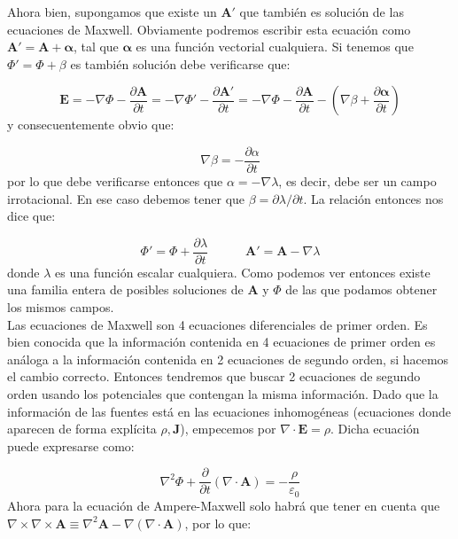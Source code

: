\documentclass[12pt,a4paper]{article}
\newcommand{\parentesis}[1]{\left( #1  \right)}
\newcommand{\parciales}[2]{\frac{\partial #1}{\partial #2}}
\newcommand{\tquad}{\quad \quad \quad}
\newcommand{\rota}{\nabla \times}
\newcommand{\dive}{\nabla \cdot}
\newcommand{\En}{\mathbf{E}}
\newcommand{\Jn}{\mathbf{J}}
\newcommand{\An}{\mathbf{A}}
\numberwithin{equation}{section}
\numberwithin{figure}{section}
\begin{document}
Ahora bien, supongamos que existe un $\An'$ que también es solución de las ecuaciones de Maxwell. Obviamente podremos escribir esta ecuación como $\An' = \An + \boldsymbol{\alpha}$, tal que $\boldsymbol{\alpha}$ es una función vectorial cualquiera. Si tenemos que $\Phi '=\Phi + \beta$ es también solución debe verificarse que:

$$
\En = - \nabla \Phi - \parciales{\An}{t} = - \nabla \Phi ' - \parciales{\An '}{t} = - \nabla \Phi - \parciales{\An}{t}  - \parentesis{  \nabla \beta + \parciales{\boldsymbol{\alpha}}{t}}
$$
y consecuentemente obvio que:

$$
\nabla \beta = - \parciales{\alpha}{t}
$$
por lo que debe verificarse entonces que $\alpha = - \nabla \lambda$, es decir, debe ser un campo irrotacional. En ese caso debemos tener que $\beta = \partial \lambda / \partial t$. La relación entonces nos dice que: 

\begin{equation}
\Phi ' =  \Phi + \parciales{\lambda}{t} \tquad \An' = \An - \nabla \lambda
\end{equation} 
donde $\lambda$ es una función escalar cualquiera. Como podemos ver entonces existe una familia entera de posibles soluciones de $\An$ y $\Phi$ de las que podamos obtener los mismos campos. \\

Las ecuaciones de Maxwell son 4 ecuaciones diferenciales de primer orden. Es bien conocida que la información contenida en 4 ecuaciones de primer orden es análoga a la información contenida en 2 ecuaciones de segundo orden, si hacemos el cambio correcto. Entonces tendremos que buscar 2 ecuaciones de segundo orden usando los potenciales que contengan la misma información. Dado que la información de las fuentes está en las ecuaciones inhomogéneas (ecuaciones donde aparecen de forma explícita $\rho,\Jn$), empecemos por $\dive \En = \rho$. Dicha ecuación puede expresarse como:

\begin{equation}
\nabla^2 \Phi + \parciales{}{t} ( \dive \An ) = - \dfrac{\rho}{\varepsilon_0}\label{Ec:01.3.09}
\end{equation}
Ahora para la ecuación de Ampere-Maxwell solo habrá que tener en cuenta que $\rota \rota \An \equiv \nabla^2 \An - \nabla (\nabla \cdot \An)$, por lo que:
\end{document}
